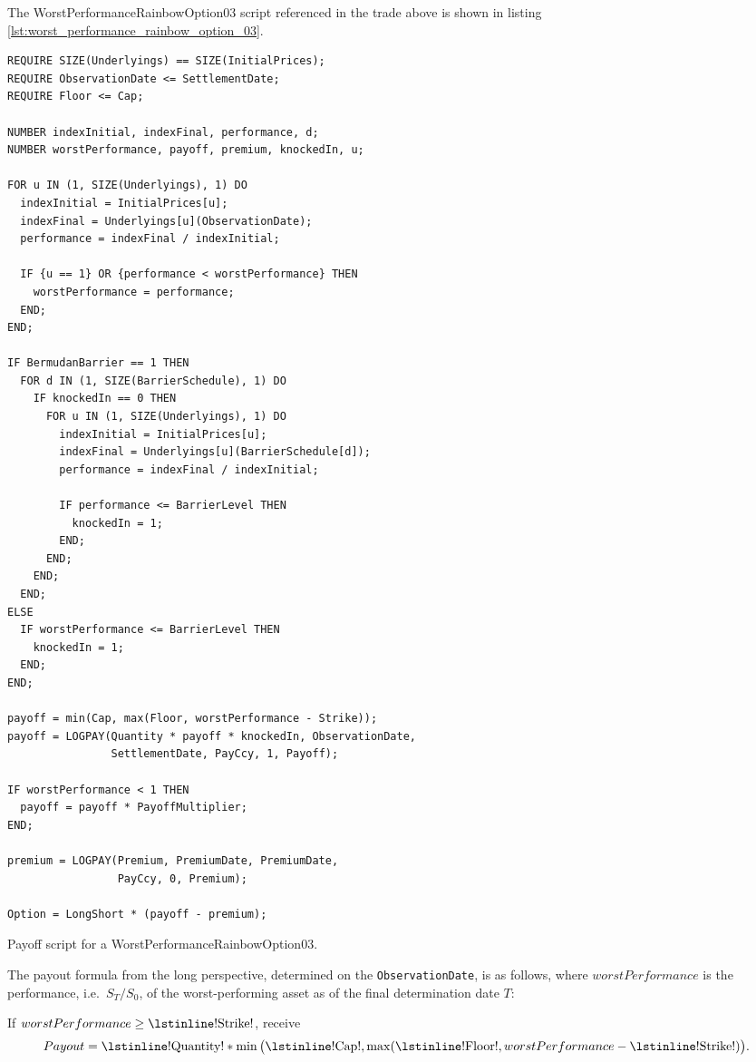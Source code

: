 The WorstPerformanceRainbowOption03 script referenced in the trade above is shown in listing
\ref{lst:worst_performance_rainbow_option_03}.

\begin{listing}[hbt]
\begin{verbatim}
REQUIRE SIZE(Underlyings) == SIZE(InitialPrices);
REQUIRE ObservationDate <= SettlementDate;
REQUIRE Floor <= Cap;

NUMBER indexInitial, indexFinal, performance, d;
NUMBER worstPerformance, payoff, premium, knockedIn, u;

FOR u IN (1, SIZE(Underlyings), 1) DO
  indexInitial = InitialPrices[u];
  indexFinal = Underlyings[u](ObservationDate);
  performance = indexFinal / indexInitial;

  IF {u == 1} OR {performance < worstPerformance} THEN
    worstPerformance = performance;
  END;
END;

IF BermudanBarrier == 1 THEN
  FOR d IN (1, SIZE(BarrierSchedule), 1) DO
    IF knockedIn == 0 THEN
      FOR u IN (1, SIZE(Underlyings), 1) DO
        indexInitial = InitialPrices[u];
        indexFinal = Underlyings[u](BarrierSchedule[d]);
        performance = indexFinal / indexInitial;

        IF performance <= BarrierLevel THEN
          knockedIn = 1;
        END;
      END;
    END;
  END;
ELSE
  IF worstPerformance <= BarrierLevel THEN
    knockedIn = 1;
  END;
END;

payoff = min(Cap, max(Floor, worstPerformance - Strike));
payoff = LOGPAY(Quantity * payoff * knockedIn, ObservationDate,
                SettlementDate, PayCcy, 1, Payoff);

IF worstPerformance < 1 THEN
  payoff = payoff * PayoffMultiplier;
END;

premium = LOGPAY(Premium, PremiumDate, PremiumDate,
                 PayCcy, 0, Premium);

Option = LongShort * (payoff - premium);
\end{verbatim}
\caption{Payoff script for a WorstPerformanceRainbowOption03.}
\label{lst:worst_performance_rainbow_option_03}
\end{listing}

The payout formula from the long perspective, determined on the \lstinline!ObservationDate!,
is as follows, where $worstPerformance$ is the performance, i.e.\ $S_T/S_0$, of the
worst-performing asset as of the final determination date $T$:

If $worstPerformance \geq \text{\lstinline!Strike!}$, receive
\begin{equation*}
  Payout = \text{\lstinline!Quantity!} * \min\big(\text{\lstinline!Cap!}, \max(\text{\lstinline!Floor!}, worstPerformance - \text{\lstinline!Strike!})\big).
\end{equation*}

